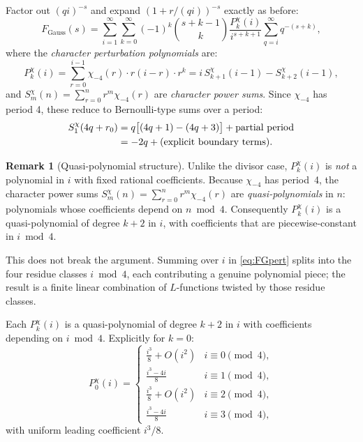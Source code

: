 \documentclass[12pt]{article}
\theoremstyle{definition}
\newtheorem{remark}[theorem]{Remark}
\begin{document}
Factor out $(qi)^{-s}$ and expand $(1 + r/(qi))^{-s}$ exactly as before:
\begin{equation}
    F_{\text{Gauss}}(s) = \sum_{i=1}^\infty \sum_{k=0}^\infty
    (-1)^k \binom{s+k-1}{k} \frac{P_k^{\chi}(i)}{i^{s+k+1}}
    \sum_{q=i}^\infty q^{-(s+k)},
    \label{eq:FGpert}
\end{equation}
where the \emph{character perturbation polynomials} are:
\begin{equation}
    P_k^{\chi}(i) = \sum_{r=0}^{i-1} \chi_{-4}(r)\cdot r(i-r)\cdot r^k
    = i\,S_{k+1}^{\chi}(i-1) - S_{k+2}^{\chi}(i-1),
    \label{eq:Pkchi}
\end{equation}
and $S_m^{\chi}(n) = \sum_{r=0}^{n} r^m \chi_{-4}(r)$ are
\emph{character power sums}.  Since $\chi_{-4}$ has period 4,
these reduce to Bernoulli-type sums over a period:
\begin{align}
    S_1^{\chi}(4q+r_0)
    &= q\bigl[(4q+1)-(4q+3)\bigr] + \text{partial period} \notag\\
    &= -2q + \text{(explicit boundary terms)}.
\end{align}
\begin{remark}[Quasi-polynomial structure]
\label{rem:quasipoly}
Unlike the divisor case, $P_k^{\chi}(i)$ is \emph{not} a polynomial in $i$
with fixed rational coefficients.  Because $\chi_{-4}$ has period~4, the
character power sums $S_m^{\chi}(n) = \sum_{r=0}^{n}r^m\chi_{-4}(r)$ are
\emph{quasi-polynomials} in $n$: polynomials whose coefficients depend on
$n \bmod 4$.  Consequently $P_k^{\chi}(i)$ is a quasi-polynomial of degree
$k+2$ in $i$, with coefficients that are piecewise-constant in $i \bmod 4$.

This does not break the argument.  Summing over $i$ in \eqref{eq:FGpert}
splits into the four residue classes $i \bmod 4$, each contributing a
genuine polynomial piece; the result is a finite linear combination of
$L$-functions twisted by those residue classes.
\end{remark}

Each $P_k^{\chi}(i)$ is a quasi-polynomial of degree $k+2$ in $i$ with
coefficients depending on $i \bmod 4$.  Explicitly for $k=0$:
\begin{equation}
    P_0^{\chi}(i) = \begin{cases}
        \tfrac{i^3}{8} + O(i^2) & i \equiv 0 \pmod{4},\\
        \tfrac{i^3 - 4i}{8}     & i \equiv 1 \pmod{4},\\
        \tfrac{i^3}{8} + O(i^2) & i \equiv 2 \pmod{4},\\
        \tfrac{i^3 - 4i}{8}     & i \equiv 3 \pmod{4},
    \end{cases}
    \label{eq:P0chi}
\end{equation}
with uniform leading coefficient $i^3/8$.
\end{document}
